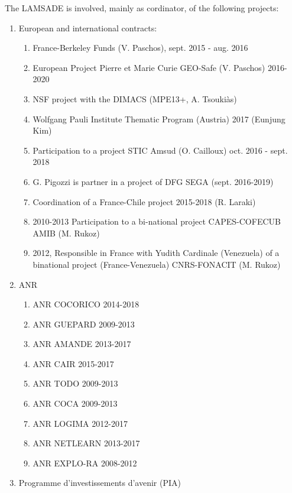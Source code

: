 \documentclass[version=last, pagesize, twoside=semi, DIV=calc, 12pt, a4paper, french, english, bibliography=totoc]{scrartcl}
\begin{document}
The LAMSADE is involved, mainly as cordinator, of the following projects:
\begin{enumerate}
\item 
European and international contracts: %
\begin{enumerate}
\item France-Berkeley Funds (V. Paschos), sept. 2015 - aug. 2016 
\item European Project Pierre et Marie Curie GEO-Safe (V. Paschos) 2016-2020
\item NSF project with the DIMACS (MPE13+, A. Tsouki\`as)
\item Wolfgang Pauli Institute Thematic Program (Austria) 2017 (Eunjung Kim) 
\item Participation to a project STIC Amsud (O. Cailloux) oct. 2016 - sept. 2018%
\item G. Pigozzi is partner in a project of DFG SEGA (sept. 2016-2019)
\item Coordination of a France-Chile project 2015-2018 (R. Laraki) 
\item 2010-2013 Participation to a bi-national project CAPES-COFECUB AMIB (M. Rukoz)  
\item  2012, Responsible in France with Yudith Cardinale (Venezuela) of a binational project  (France-Venezuela) CNRS-FONACIT (M. Rukoz)
\end{enumerate}
\item ANR
 \begin{enumerate}
 \item ANR COCORICO 2014-2018
 \item ANR GUEPARD 2009-2013
 \item ANR AMANDE 2013-2017
 \item ANR CAIR 2015-2017
 \item ANR TODO 2009-2013
 \item ANR COCA 2009-2013
 \item ANR LOGIMA 2012-2017
 \item ANR NETLEARN 2013-2017 
 \item ANR EXPLO-RA 2008-2012
 \end{enumerate}
\item Programme d'investissements d'avenir (PIA) 
\begin{enumerate}

\end{enumerate}
\end{enumerate}
\end{document}
